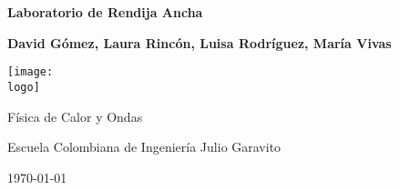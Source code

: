 \documentclass{article}
\newcommand{\logo}{"C:/Users/usuario/OneDrive/Documentos/U/logo-eci.png"}
\newcommand{\titlename}{Laboratorio de Rendija Ancha}
\renewcommand{\author}{{David Gómez, Laura Rincón, Luisa Rodríguez, María Vivas}}
\begin{document}
\begin{titlepage}
    \begin{center}
        \vspace{1cm}

        \textbf{\Huge{\titlename}}

        \vspace{1.5cm}

        \textbf{\large{\author}}

        \vspace{3cm}

        \texttt{[image: \\logo]}
        
        \vfill

        Física de Calor y Ondas

        Escuela Colombiana de Ingeniería Julio Garavito

        \today
    \end{center}
\end{titlepage}

\clearpage
\tableofcontents






\end{document}
